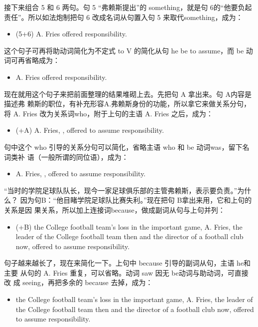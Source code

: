 接下来组合 5 和 6 两句。句 5 “弗赖斯提出”的 something，就是句 6的“他要负起
责任”。所以如法炮制把句 6 改成名词从句置入句 5 来取代something，成为：
\begin{itemize}
\item (5+6) A. Fries offered  responsibility.
\end{itemize}
这个句子可再将助动词简化为不定式 to V 的简化从句 he be to assume，而 be
动词可再省略成为：
\begin{itemize}
\item A. Fries offered  responsibility.
\end{itemize}

现在就用这个句子来把前面整理的结果堆砌上去。先把句 A 拿出来。句 A内容是描述弗
赖斯的职位，有补充形容A.弗赖斯身份的功能，所以拿它来做关系分句，将 A. Fries
改为关系词who，附于上句的主语 A. Fries 之后，成为：
\begin{itemize}
\item (+A) A. Fries, , offered to assume responsibility.
\end{itemize}
句中这个 who 引导的关系分句可以简化，省略主语 who 和 be 动词was，留下名词类补
语（一般所谓的同位语），成为：
\begin{itemize}
\item A. Fries, , offered to assume responsibility.
\end{itemize}
“当时的学院足球队队长，现今一家足球俱乐部的主管弗赖斯，表示要负责。”为什么？
因为句B：“他目睹学院足球队比赛失利。”现在把句 B拿出来用，它和上句的关系是因
果关系，所以加上连接词because，做成副词从句与上句并列：
\begin{itemize}
\item (+B)  the College football team's loss in the important
  game, A. Fries, the leader of the College football team then and the
  director of a football club now, offered to assume responsibility.
\end{itemize}
句子越来越长了，现在来简化一下。上句中 because 引导的副词从句，主语 he和主要
从句的 A. Fries 重复，可以省略。动词 saw 因无 be动词与助动词，可直接改
成 seeing，再把多余的 because 去掉，成为：
\begin{itemize}
\item {} the College football team's loss in the important game, A. Fries,
  the leader of the College football team then and the director of a
  football club now, offered to assume responsibility.
\end{itemize}

